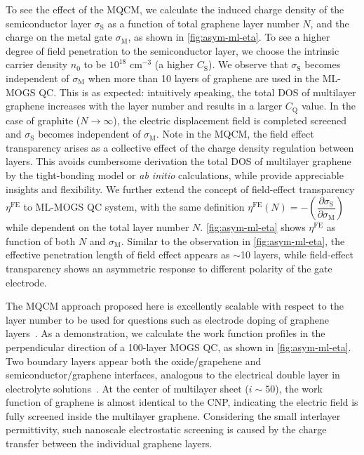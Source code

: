 To see the effect of the MQCM, we calculate the induced charge density
of the semiconductor layer $\sigma_{\mathrm{S}}$ as a function of
total graphene layer number $N$, and the charge on the metal gate
$\sigma_{\mathrm{M}}$, as shown in \autoref{fig:asym-ml-eta}.
%
To see a higher degree of field penetration to the semiconductor
layer, we choose the intrinsic carrier density $n_{0}$ to be $10^{18}$
cm$^{-3}$ (\ie a higher $C_{\mathrm{S}}$).
%
We observe that $\sigma_{\mathrm{S}}$ becomes independent of
$\sigma_{\mathrm{M}}$ when more than 10 layers of graphene are used in
the ML-MOGS QC.
%
This is as expected: intuitively speaking, the total DOS of multilayer
graphene increases with the layer number and results in a larger
$C_{\mathrm{Q}}$ value.
%
In the case of graphite ($N \to \infty$), the electric displacement
field is completed screened and $\sigma_{\mathrm{S}}$ becomes independent
of $\sigma_{\mathrm{M}}$.
%
Note in the MQCM, the field effect transparency arises as a collective
effect of the charge density regulation between layers. This avoids
cumbersome derivation the total DOS of multilayer graphene by the
tight-bonding model \autocite{Nilsson_2008_bitri_gr_electron} or
\textit{ab initio} calculations, while provide appreciable insights
and flexibility.
%
We further extend the concept of field-effect transparency
$\eta^{\mathrm{FE}}$ to ML-MOGS QC system, with the same definition
$\eta^{\mathrm{FE}}(N) = -\left(\dfrac{\partial
    \sigma_{\mathrm{S}}}{\partial \sigma_{\mathrm{M}}}\right)$ while
dependent on the total layer number $N$.
%
\autoref{fig:asym-ml-eta} shows $\eta^{\mathrm{FE}}$ as function of both $N$ and $\sigma_{\mathrm{M}}$.
%
Similar to the observation in \autoref{fig:asym-ml-eta}, the
effective penetration length of field effect appears as $\sim{}$10
layers, while field-effect transparency shows an asymmetric response
to different polarity of the gate electrode.
%

The MQCM approach proposed here is excellently scalable with respect
to the layer number to be used for questions such as electrode doping
of graphene
layers~\autocite{Pi_2009_metal_doping_gr,Giovannetti_2008_doping}.
%
As a demonstration, we calculate the work function profiles in the
perpendicular direction of a 100-layer MOGS QC, as shown in
\autoref{fig:asym-ml-eta}.
%
Two boundary layers appear both the oxide/grapehene and
semiconductor\allowbreak{}/graphene interfaces, analogous to the
electrical double layer in electrolyte
solutions~\autocite{Bard_1980_electrochem_book}.
%
At the center of multilayer sheet ($i \sim{} 50$), the work function
of graphene is almost identical to the CNP, indicating the electric
field is fully screened inside the multilayer graphene.
%
Considering the small interlayer permittivity, such nano\-scale
electrostatic screening is caused by the charge transfer between the
individual graphene layers.

